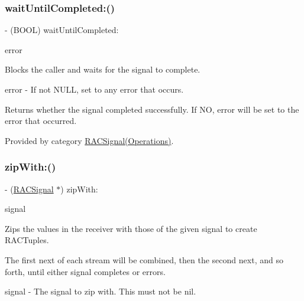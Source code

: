 \subsubsection{\texorpdfstring{wait\+Until\+Completed\+:()}{waitUntilCompleted:()}\hspace{0.1cm}{\footnotesize\ttfamily [3/3]}}
{\footnotesize\ttfamily -\/ (B\+O\+OL) wait\+Until\+Completed\+: \begin{DoxyParamCaption}\item[{(N\+S\+Error $\ast$$\ast$)}]{error }\end{DoxyParamCaption}}

Blocks the caller and waits for the signal to complete.

error -\/ If not N\+U\+LL, set to any error that occurs.

Returns whether the signal completed successfully. If NO, {\ttfamily error} will be set to the error that occurred. 

Provided by category \mbox{\hyperlink{category_r_a_c_signal_07_operations_08_af4c476fc335ca830841bd4fd267f05ce}{R\+A\+C\+Signal(\+Operations)}}.

\mbox{\label{interface_r_a_c_signal_ac822f657df311327de76bc55bcae689d}} 
\subsubsection{\texorpdfstring{zip\+With\+:()}{zipWith:()}\hspace{0.1cm}{\footnotesize\ttfamily [1/3]}}
{\footnotesize\ttfamily -\/ (\mbox{\hyperlink{interface_r_a_c_signal}{R\+A\+C\+Signal}} $\ast$) zip\+With\+: \begin{DoxyParamCaption}\item[{(\mbox{\hyperlink{interface_r_a_c_signal}{R\+A\+C\+Signal}} $\ast$)}]{signal }\end{DoxyParamCaption}}

Zips the values in the receiver with those of the given signal to create R\+A\+C\+Tuples.

The first {\ttfamily next} of each stream will be combined, then the second {\ttfamily next}, and so forth, until either signal completes or errors.

signal -\/ The signal to zip with. This must not be {\ttfamily nil}.

